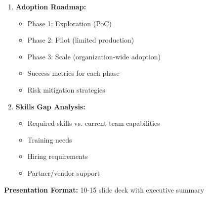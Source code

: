 \begin{exercise}
\begin{enumerate}
    \item \textbf{Adoption Roadmap:}
    \begin{itemize}
        \item Phase 1: Exploration (PoC)
        \item Phase 2: Pilot (limited production)
        \item Phase 3: Scale (organization-wide adoption)
        \item Success metrics for each phase
        \item Risk mitigation strategies
    \end{itemize}

    \item \textbf{Skills Gap Analysis:}
    \begin{itemize}
        \item Required skills vs. current team capabilities
        \item Training needs
        \item Hiring requirements
        \item Partner/vendor support
    \end{itemize}
\end{enumerate}

\textbf{Presentation Format:} 10-15 slide deck with executive summary
\end{exercise}

